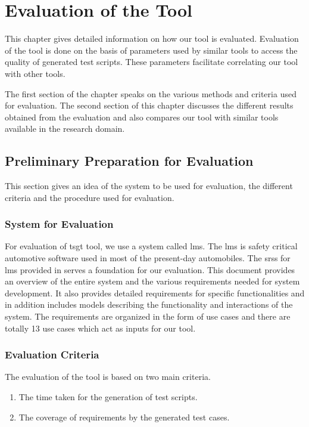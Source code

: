 
\chapter{Evaluation of the Tool}\label{evaluation} 
This chapter gives detailed information on how our tool is evaluated. Evaluation of the tool is done on the basis of parameters used by similar tools to access the quality of generated test scripts. These parameters facilitate correlating our tool with other tools.

The first section of the chapter speaks on the various methods and criteria used for evaluation. The second section of this chapter discusses the different results obtained from the evaluation and also compares our tool with similar tools available in the research domain.
\section{Preliminary Preparation for Evaluation}
This section gives an idea of the system to be used for evaluation, the different criteria and the procedure used for evaluation.
\subsection{System for Evaluation}
For evaluation of \gls{tsgt} tool, we use a system called \gls{lms}. The \gls{lms} is safety critical automotive software used in most of the present-day automobiles. The \glspl{srs} for \gls{lms} provided in \cite{blazysoftware} serves a foundation for our evaluation. This document provides an overview of the entire system and the various requirements needed for system development.  It also provides detailed requirements for specific functionalities and in addition includes models describing the functionality and interactions of the system. The requirements are organized in the form of use cases and there are totally 13 use cases which act as inputs for our tool.
\subsection{Evaluation Criteria}\label{criteria}
The evaluation of the tool is based on two main criteria.
\begin{enumerate}
\item The time taken for the generation of test scripts.
\item The coverage of requirements by the generated test cases.
\end{enumerate}
